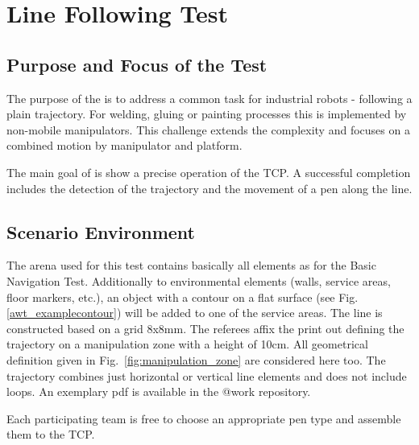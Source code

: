 
\newpage
\section{Line Following Test}

\subsection{Purpose and Focus of the Test}
The purpose of the  is to address a common task
for industrial robots - following a plain trajectory. For welding, gluing or
painting processes this is implemented by non-mobile manipulators.  This
challenge extends the complexity and focuses on a combined motion by manipulator
and platform. \par The main goal of is show a precise operation of the TCP. A
successful completion includes the detection of the trajectory and the movement
of a pen along the line.

\subsection{Scenario Environment}
The arena used for this test contains basically all elements as for the Basic
Navigation Test. Additionally to environmental elements (walls, service areas,
floor markers, etc.), an object with a contour on a flat surface (see Fig.
\ref{awt_examplecontour}) will be added to one of the service areas. The line is
constructed based on a grid 8x8mm. The referees affix the print out defining the
trajectory on a manipulation zone with a height of 10cm. All geometrical
definition given in Fig.~\ref{fig:manipulation_zone} are considered here too.
The trajectory combines just horizontal or vertical line elements and does not
include loops. An exemplary pdf is available in the @work repository.

Each participating team is free to choose an appropriate pen type and assemble
them to the TCP.

